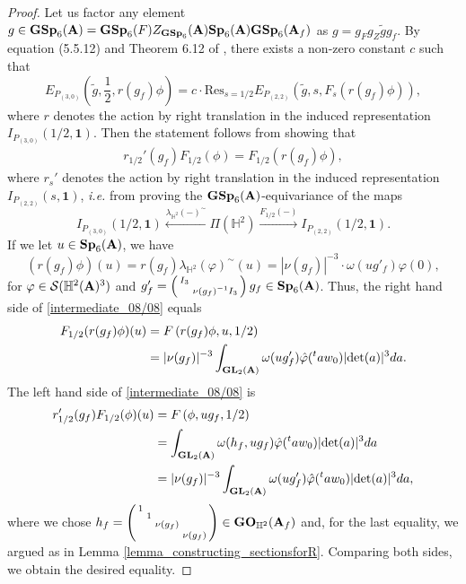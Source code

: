 \documentclass[11pt, reqno]{amsart}
\theoremstyle{plain}
\theoremstyle{definition}
\theoremstyle{remark}
\theoremstyle{plain}
\def\A{{\bf A}}
\def\det{\mathrm{det}}
\def\GSp{{\mathbf{GSp}}}
\def\Sp{{\mathbf{Sp}}}
\def\GO{{\mathbf{GO}}}
\def\GL{\mathbf{GL}}
\begin{document}
\begin{proof}
Let us factor any element $g\in\GSp_6(\A) = \GSp_6(F)Z_{\GSp_6}(\A)\Sp_6(\A)\GSp_6(\A_f)$ as $g = g_Fg_Z\tilde{g}g_f$. By equation (5.5.12) and Theorem 6.12 of \cite{KudlaRallis}, there exists a non-zero constant $c$ such that \begin{equation}\label{equalityEisensteinClassic}E_{P_{(3,0)}}\left(\tilde{g},\frac{1}{2}, r(g_f)\phi \right) =c \cdot  \mathrm{Res}_{s = 1/2} E_{P_{(2,2)}}\left(\tilde{g},s,F_s(r(g_f)\phi)\right),\end{equation}
where $r$ denotes the action by right translation in the induced representation  $I_{P_{(3,0)}}\left(1/2,\mathbf{1}\right)$.
    Then the statement follows from showing that 
    \begin{align}\label{intermediate_08/08} r_{1/2}'(g_f)F_{1/2}(\phi) = F_{1/2}( r(g_f) \phi),
    \end{align}
    where $r_s'$ denotes the action by right translation in the induced representation $I_{P_{(2,2)}}(s, \mathbf{1})$, \emph{i.e.} from proving the $\GSp_6(\A)$-equivariance of the maps $$ I_{P_{(3,0)}}(1/2,\mathbf{1}) \xleftarrow{\lambda_{\mathbb{H}^2}(-)^\sim} \Pi(\mathbb{H}^2) \xrightarrow{F_{1/2}(-)} I_{P_{(2,2)}}(1/2, \mathbf{1}).$$
If we let $u \in\Sp_6(\A)$, we have 
$$(r(g_f) \phi)(u) = r(g_f) \lambda_{\mathbb{H}^2}(\varphi)^\sim(u) = | \nu(g_f)|^{-3} \cdot \omega(u g'_f)\varphi(0),$$
for $\varphi \in \mathcal{S}(\mathbb{H}^2(\A)^3)$ and $g'_f = \left(\begin{smallmatrix}I_3& \\ &\nu(g_f)^{-1}I_3\end{smallmatrix}\right) g_f\in \Sp_6(\A)$. Thus, 
the right hand side
of \eqref{intermediate_08/08} equals  \begin{align*} F_{1/2}( r(g_f) \phi)(u) &= F\left(r(g_f) \phi, u, 1/2\right) \\ &= | \nu(g_f)|^{-3} \int_{\GL_2(\A)}\omega(u g_f')  \hat{\varphi}
    (^{t}aw_0)|\det(a)|^{3} d a.
\end{align*}
The left hand side
of \eqref{intermediate_08/08} is 
\begin{align*} r_{1/2}'(g_f)F_{1/2}(\phi)(u) &= F\left( \phi, u g_f, 1/2\right) \\ &= \int_{\GL_2(\A)} \omega(h_f,u g_f) \hat{\varphi}
    (^{t}aw_0)|\det(a)|^{3} d a \\  &= | \nu(g_f)|^{-3}\int_{\GL_2(\A)} \omega(u g'_f)\hat{\varphi}({}^{t}aw_0)|\det(a)|^{3}da,
\end{align*}
where we chose $h_f = \left(\begin{smallmatrix} 1 & & & \\ & 1 & & \\ & & \nu(g_f) & \\ & & & \nu(g_f) \end{smallmatrix}\right) \in \GO_{\mathbb{H}^2}(\A_f)$ and, for the last equality, we argued as in Lemma \ref{lemma_constructing_sectionsforR}. Comparing both sides, we obtain the desired equality. 
\end{proof}
\end{document}
